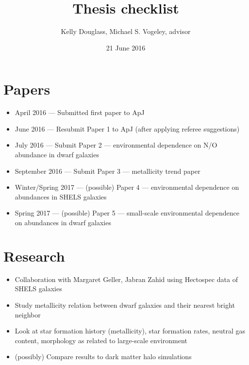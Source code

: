 \documentclass{article}
\begin{document}
\title{Thesis checklist}
\author{Kelly Douglass, Michael S. Vogeley, advisor}
\date{21 June 2016}

\maketitle



\section*{Papers}
\begin{itemize}
    \item April 2016 --- Submitted first paper to ApJ
    \item June 2016 --- Resubmit Paper 1 to ApJ (after applying referee suggestions)
    \item July 2016 --- Submit Paper 2 --- environmental dependence on N/O abundance in dwarf galaxies
    \item September 2016 --- Submit Paper 3 --- metallicity trend paper
    \item Winter/Spring 2017 --- (possible) Paper 4 --- environmental dependence on abundances in SHELS galaxies
    \item Spring 2017 --- (possible) Paper 5 --- small-scale environmental dependence on abundances in dwarf galaxies
\end{itemize}


\section*{Research}
\begin{itemize}
    \item Collaboration with Margaret Geller, Jabran Zahid using Hectospec data of SHELS galaxies
    \item Study metallicity relation between dwarf galaxies and their nearest bright neighbor
    \item Look at star formation history (metallicity), star formation rates, neutral gas content, morphology as related to large-scale environment
    \item (possibly) Compare results to dark matter halo simulations
\end{itemize}
\end{document}
